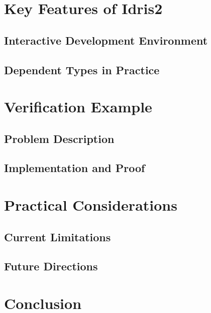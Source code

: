 \documentclass[]{rptuseminar}
\begin{document}
\section{Key Features of Idris2}  
\label{sec:key-features}  
\subsection{Interactive Development Environment}  
\label{subsec:ide}  

\subsection{Dependent Types in Practice}  
\label{subsec:dependent-types}  

\section{Verification Example}  
\label{sec:verification-example}  
\subsection{Problem Description}  
\label{subsec:problem-desc}  

\subsection{Implementation and Proof}  
\label{subsec:implementation}  

\section{Practical Considerations}  
\label{sec:practical-considerations}  
\subsection{Current Limitations}  
\label{subsec:limitations}  

\subsection{Future Directions}  
\label{subsec:future}  

\section{Conclusion}  
\label{sec:conclusion}  

\newpage
\nocite{*}



\end{document}
